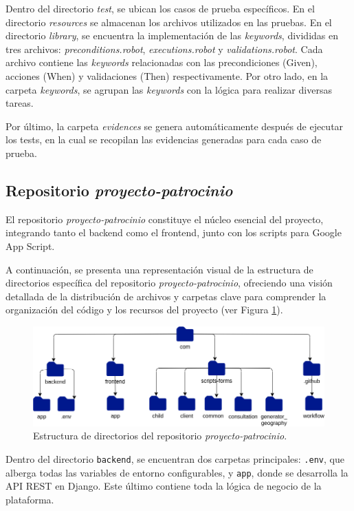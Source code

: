Dentro del directorio \textit{test}, se ubican los casos de prueba específicos. En el directorio \textit{resources} se almacenan los archivos utilizados en las pruebas. En el directorio \textit{library}, se encuentra la implementación de las \textit{keywords}, divididas en tres archivos: \textit{preconditions.robot}, \textit{executions.robot} y \textit{validations.robot}. Cada archivo contiene las \textit{keywords} relacionadas con las precondiciones (Given), acciones (When) y validaciones (Then) respectivamente. Por otro lado, en la carpeta \textit{keywords}, se agrupan las \textit{keywords} con la lógica para realizar diversas tareas.

Por último, la carpeta \textit{evidences} se genera automáticamente después de ejecutar los tests, en la cual se recopilan las evidencias generadas para cada caso de prueba.

\subsection{Repositorio \textit{proyecto-patrocinio}}

El repositorio \textit{proyecto-patrocinio} constituye el núcleo esencial del proyecto, integrando tanto el backend como el frontend, junto con los scripts para Google App Script.

A continuación, se presenta una representación visual de la estructura de directorios específica del repositorio \textit{proyecto-patrocinio}, ofreciendo una visión detallada de la distribución de archivos y carpetas clave para comprender la organización del código y los recursos del proyecto (ver Figura \ref{fig:unit-directory}).

\begin{figure}[h]
    \centering
    \includegraphics[width=1\linewidth]{fig/directory.png}
    \caption{Estructura de directorios del repositorio \textit{proyecto-patrocinio}.}
    \label{fig:unit-directory}
\end{figure}

Dentro del directorio \texttt{backend}, se encuentran dos carpetas principales: \texttt{.env}, que alberga todas las variables de entorno configurables, y \texttt{app}, donde se desarrolla la API REST en Django. Este último contiene toda la lógica de negocio de la plataforma.

